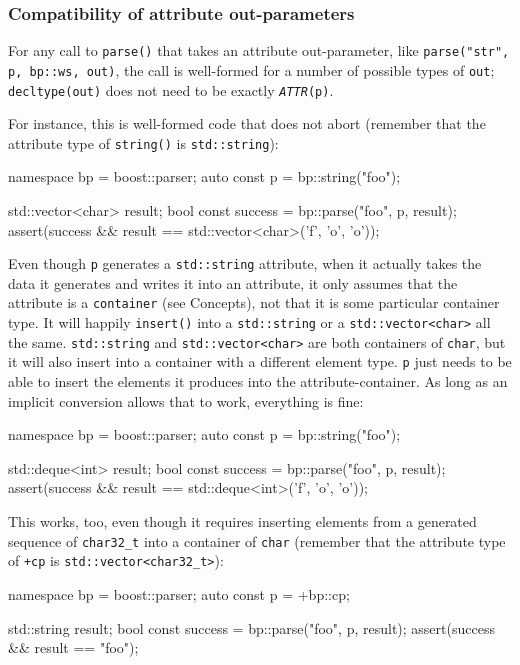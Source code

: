 \subsubsection{Compatibility of attribute out-parameters}

For any call to \texttt{parse()} that takes an attribute out-parameter, like \texttt{parse("str", p, bp::ws, out)}, the call is well-formed for a number of possible types of \texttt{out}; \texttt{decltype(out)} does not need to be exactly \emph{\texttt{ATTR}}\texttt{(p)}.

For instance, this is well-formed code that does not abort (remember that the attribute type of \texttt{string()} is \texttt{std::string}):

\begin{code}
namespace bp = boost::parser;
auto const p = bp::string("foo");

std::vector<char> result;
bool const success = bp::parse("foo", p, result);
assert(success && result == std::vector<char>({'f', 'o', 'o'}));
\end{code}

Even though \texttt{p} generates a \texttt{std::string} attribute, when it actually takes the data it generates and writes it into an attribute, it only assumes that the attribute is a \texttt{container} (see Concepts), not that it is some particular container type. It will happily \texttt{insert()} into a \texttt{std::string} or a \texttt{std::vector<char>} all the same. \texttt{std::string} and \texttt{std::vector<char>} are both containers of \texttt{char}, but it will also insert into a container with a different element type. \texttt{p} just needs to be able to insert the elements it produces into the attribute-container. As long as an implicit conversion allows that to work, everything is fine:

\begin{code}
namespace bp = boost::parser;
auto const p = bp::string("foo");

std::deque<int> result;
bool const success = bp::parse("foo", p, result);
assert(success && result == std::deque<int>({'f', 'o', 'o'}));
\end{code}

This works, too, even though it requires inserting elements from a generated sequence of \texttt{char32\_t} into a container of \texttt{char} (remember that the attribute type of \texttt{+cp} is \texttt{std::vector<char32\_t>}):

\begin{code}
namespace bp = boost::parser;
auto const p = +bp::cp;

std::string result;
bool const success = bp::parse("foo", p, result);
assert(success && result == "foo");
\end{code}

